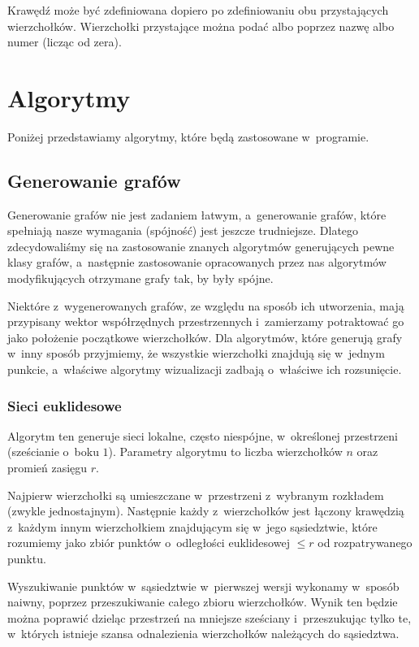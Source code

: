 \documentclass[a4paper,onecolumn,oneside,12pt]{mwart}
\begin{document}
Krawędź może być zdefiniowana dopiero po zdefiniowaniu obu przystających
wierzchołków. Wierzchołki przystające można podać albo poprzez nazwę albo
numer (licząc od zera).

\section{Algorytmy}

Poniżej przedstawiamy algorytmy, które będą zastosowane w~programie.

\subsection{Generowanie grafów}

Generowanie grafów nie jest zadaniem łatwym, a~generowanie grafów, które
spełniają nasze wymagania (spójność) jest jeszcze trudniejsze. Dlatego
zdecydowaliśmy się na zastosowanie znanych algorytmów generujących pewne
klasy grafów, a~następnie zastosowanie opracowanych przez nas algorytmów
modyfikujących otrzymane grafy tak, by były spójne.

Niektóre z~wygenerowanych grafów, ze względu na sposób ich utworzenia, mają
przypisany wektor współrzędnych przestrzennych i~zamierzamy potraktować go
jako położenie początkowe wierzchołków. Dla algorytmów, które generują
grafy w~inny sposób przyjmiemy, że wszystkie wierzchołki znajdują się
w~jednym punkcie, a~właściwe algorytmy wizualizacji zadbają o~właściwe ich
rozsunięcie.

\subsubsection{Sieci euklidesowe}

Algorytm ten generuje sieci lokalne, często niespójne, w~określonej
przestrzeni (sześcianie o~boku $1$). Parametry
algorytmu to liczba wierzchołków $n$ oraz promień zasięgu $r$.

Najpierw wierzchołki są umieszczane w~przestrzeni z~wybranym rozkładem
(zwykle jednostajnym). Następnie każdy z~wierzchołków jest łączony
krawędzią z~każdym innym wierzchołkiem znajdującym się w~jego sąsiedztwie,
które rozumiemy jako zbiór punktów o~odległości euklidesowej $\le r$ od
rozpatrywanego punktu.

Wyszukiwanie punktów w~sąsiedztwie w~pierwszej wersji wykonamy w~sposób
naiwny, poprzez przeszukiwanie całego zbioru wierzchołków. Wynik ten będzie
można poprawić dzieląc przestrzeń na mniejsze sześciany i~przeszukując
tylko te, w~których istnieje szansa odnalezienia wierzchołków należących do
sąsiedztwa.
\end{document}

